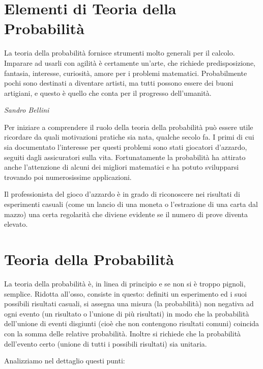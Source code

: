 
\section{Elementi di Teoria della Probabilità}

\epigraph{La teoria della probabilità fornisce strumenti molto generali per il calcolo. Imparare ad usarli con agilità è certamente un’arte, che richiede predisposizione, fantasia, interesse, curiosità, amore per i problemi matematici. Probabilmente pochi sono destinati a diventare artisti, ma tutti possono essere dei buoni artigiani, e questo è quello che conta per il progresso dell’umanità.}{\textit{Sandro Bellini}}

Per iniziare a comprendere il ruolo della teoria della probabilità può essere utile ricordare da quali motivazioni pratiche sia nata, qualche secolo fa. I primi di cui sia documentato l’interesse per questi problemi sono stati giocatori d’azzardo, seguiti dagli assicuratori sulla vita. Fortunatamente la probabilità ha attirato anche l’attenzione di alcuni dei migliori matematici e ha potuto svilupparsi trovando poi numerosissime applicazioni.

Il professionista del gioco d'azzardo è in grado di riconoscere nei risultati di esperimenti casuali (come un lancio di una moneta o l'estrazione di una carta dal mazzo) una certa regolarità che diviene evidente se il numero di prove diventa elevato.

\section{Teoria della Probabilità}

La teoria della probabilità è, in linea di principio e se non si è troppo pignoli, semplice. Ridotta all’osso, consiste in questo: definiti un esperimento ed i suoi possibili risultati casuali, si assegna una misura (la probabilità) non negativa ad ogni evento (un risultato o l’unione di più risultati) in modo che la probabilità dell'unione di eventi disgiunti (cioè che non contengono risultati comuni) coincida con la somma delle relative probabilità. Inoltre si richiede che la probabilità dell’evento certo (unione di tutti i possibili risultati) sia unitaria.

Analizziamo nel dettaglio questi punti:

